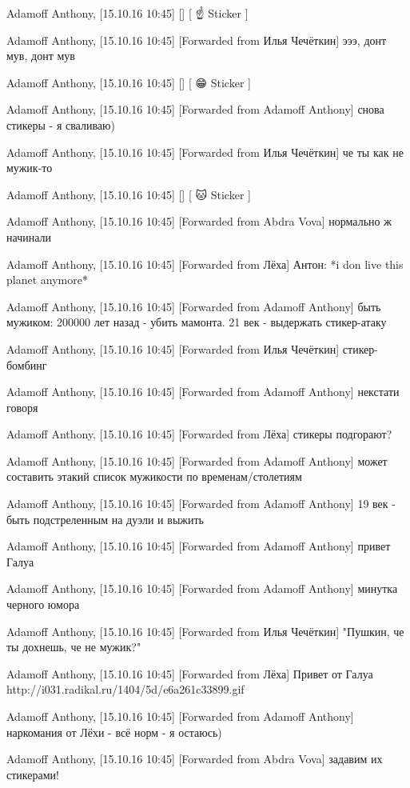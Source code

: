 Adamoff Anthony, [15.10.16 10:45]
[]
[ ☝️ Sticker ]

Adamoff Anthony, [15.10.16 10:45]
[Forwarded from Илья Чечёткин]
эээ, донт мув, донт мув

Adamoff Anthony, [15.10.16 10:45]
[]
[ 😁 Sticker ]

Adamoff Anthony, [15.10.16 10:45]
[Forwarded from Adamoff Anthony]
снова стикеры - я сваливаю)

Adamoff Anthony, [15.10.16 10:45]
[Forwarded from Илья Чечёткин]
че ты как не мужик-то

Adamoff Anthony, [15.10.16 10:45]
[]
[ 🐱 Sticker ]

Adamoff Anthony, [15.10.16 10:45]
[Forwarded from Abdra Vova]
нормально ж начинали

Adamoff Anthony, [15.10.16 10:45]
[Forwarded from Лёха]
Антон: *i don live this planet anymore*

Adamoff Anthony, [15.10.16 10:45]
[Forwarded from Adamoff Anthony]
быть мужиком: 200000 лет назад - убить мамонта. 21 век - выдержать стикер-атаку

Adamoff Anthony, [15.10.16 10:45]
[Forwarded from Илья Чечёткин]
стикер-бомбинг

Adamoff Anthony, [15.10.16 10:45]
[Forwarded from Adamoff Anthony]
некстати говоря

Adamoff Anthony, [15.10.16 10:45]
[Forwarded from Лёха]
стикеры подгорают?

Adamoff Anthony, [15.10.16 10:45]
[Forwarded from Adamoff Anthony]
может составить этакий список мужикости по временам/столетиям

Adamoff Anthony, [15.10.16 10:45]
[Forwarded from Adamoff Anthony]
19 век - быть подстреленным на дуэли и выжить

Adamoff Anthony, [15.10.16 10:45]
[Forwarded from Adamoff Anthony]
привет Галуа

Adamoff Anthony, [15.10.16 10:45]
[Forwarded from Adamoff Anthony]
минутка черного юмора

Adamoff Anthony, [15.10.16 10:45]
[Forwarded from Илья Чечёткин]
"Пушкин, че ты дохнешь, че не мужик?"

Adamoff Anthony, [15.10.16 10:45]
[Forwarded from Лёха]
Привет от Галуа
http://i031.radikal.ru/1404/5d/e6a261c33899.gif

Adamoff Anthony, [15.10.16 10:45]
[Forwarded from Adamoff Anthony]
наркомания от Лёхи - всё норм - я остаюсь)

Adamoff Anthony, [15.10.16 10:45]
[Forwarded from Abdra Vova]
задавим их стикерами!

